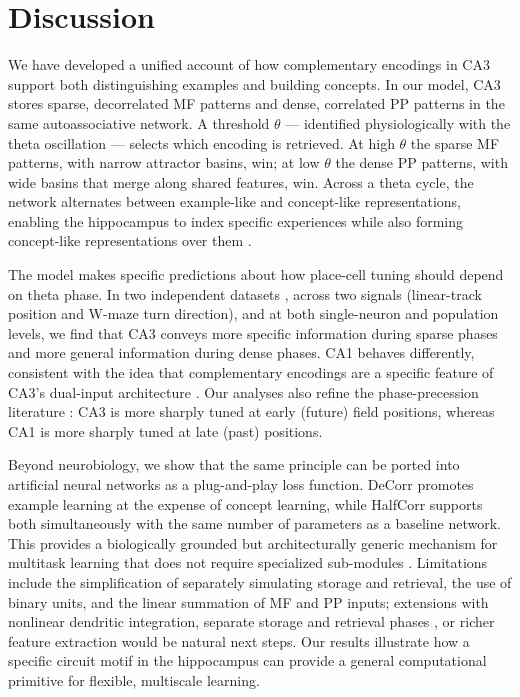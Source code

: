 \documentclass[11pt]{article}
\begin{document}
\section{Discussion}

We have developed a unified account of how complementary encodings in CA3 support both distinguishing examples and building concepts. In our model, CA3 stores sparse, decorrelated MF patterns and dense, correlated PP patterns in the same autoassociative network. A threshold $\theta$ --- identified physiologically with the theta oscillation --- selects which encoding is retrieved. At high $\theta$ the sparse MF patterns, with narrow attractor basins, win; at low $\theta$ the dense PP patterns, with wide basins that merge along shared features, win. Across a theta cycle, the network alternates between example-like and concept-like representations, enabling the hippocampus to index specific experiences \cite{teyler1986index,scoville1957} while also forming concept-like representations over them \cite{quiroga2005,schapiro2017complementary}.

The model makes specific predictions about how place-cell tuning should depend on theta phase. In two independent datasets \cite{mizuseki2013crcns,karlsson2015}, across two signals (linear-track position and W-maze turn direction), and at both single-neuron and population levels, we find that CA3 conveys more specific information during sparse phases and more general information during dense phases. CA1 behaves differently, consistent with the idea that complementary encodings are a specific feature of CA3's dual-input architecture \cite{amaral1990,oreilly1994,caycogajic2017}. Our analyses also refine the phase-precession literature \cite{okeefe1993,skaggs1996}: CA3 is more sharply tuned at early (future) field positions, whereas CA1 is more sharply tuned at late (past) positions.

Beyond neurobiology, we show that the same principle can be ported into artificial neural networks as a plug-and-play loss function. DeCorr promotes example learning at the expense of concept learning, while HalfCorr supports both simultaneously with the same number of parameters as a baseline network. This provides a biologically grounded but architecturally generic mechanism for multitask learning that does not require specialized sub-modules \cite{lecun2015deeplearning,kowadlo2020}. Limitations include the simplification of separately simulating storage and retrieval, the use of binary units, and the linear summation of MF and PP inputs; extensions with nonlinear dendritic integration, separate storage and retrieval phases \cite{hasselmo2002,colgin2013}, or richer feature extraction would be natural next steps. Our results illustrate how a specific circuit motif in the hippocampus can provide a general computational primitive for flexible, multiscale learning.



\end{document}
